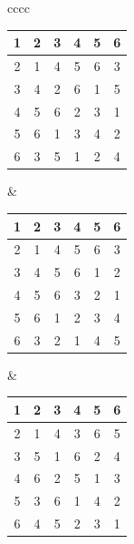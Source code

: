 \begin{center}
\begin{tabular}{cccc}
\begin{tabular}{|c@{\hspace{1.5mm}}|c@{\hspace{1.5mm}}|c@{\hspace{1.5mm}}
|c@{\hspace{1.5mm}}|c@{\hspace{1.5mm}}|c@{\hspace{1.5mm}}|} \hline
1&2&3&4&5&6  \\ \hline
2&1&4&5&6&3  \\ \hline
3&4&2&6&1&5  \\ \hline
4&5&6&2&3&1  \\ \hline
5&6&1&3&4&2  \\ \hline
6&3&5&1&2&4  \\ \hline
\end{tabular} & 
\begin{tabular}{|c@{\hspace{1.5mm}}|c@{\hspace{1.5mm}}|c@{\hspace{1.5mm}}
|c@{\hspace{1.5mm}}|c@{\hspace{1.5mm}}|c@{\hspace{1.5mm}}|} \hline
1&2&3&4&5&6  \\ \hline
2&1&4&5&6&3  \\ \hline
3&4&5&6&1&2  \\ \hline
4&5&6&3&2&1  \\ \hline
5&6&1&2&3&4  \\ \hline
6&3&2&1&4&5  \\ \hline
\end{tabular} & 
\begin{tabular}{|c@{\hspace{1.5mm}}|c@{\hspace{1.5mm}}|c@{\hspace{1.5mm}}
|c@{\hspace{1.5mm}}|c@{\hspace{1.5mm}}|c@{\hspace{1.5mm}}|} \hline
1&2&3&4&5&6  \\ \hline
2&1&4&3&6&5  \\ \hline
3&5&1&6&2&4  \\ \hline
4&6&2&5&1&3  \\ \hline
5&3&6&1&4&2  \\ \hline
6&4&5&2&3&1  \\ \hline

\end{tabular}
\end{tabular}
\end{center}
